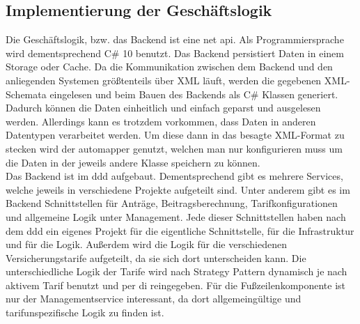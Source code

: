 \subsection{Implementierung der Geschäftslogik}
\label{geschaeftslogikimplementieren}
Die Geschäftslogik, bzw. das Backend ist eine \gls{net} \gls{api}. Als Programmiersprache wird dementsprechend C\# 10 benutzt. Das Backend persistiert Daten in einem Storage oder Cache.  Da die Kommunikation zwischen dem Backend und den anliegenden Systemen größtenteils über XML läuft, werden die gegebenen XML-Schemata eingelesen und beim Bauen des Backends als C\# Klassen generiert. Dadurch können die Daten einheitlich und einfach geparst und ausgelesen werden. Allerdings kann es trotzdem vorkommen, dass Daten in anderen Datentypen verarbeitet werden. Um diese dann in das besagte XML-Format zu stecken  wird der \gls{automapper} genutzt, welchen man nur konfigurieren muss um die Daten in der jeweils andere Klasse speichern zu können.\\

Das Backend ist im \gls{ddd} aufgebaut. Dementsprechend gibt es mehrere Services, welche jeweils in verschiedene Projekte aufgeteilt sind. Unter anderem gibt es im Backend Schnittstellen für Anträge, Beitragsberechnung, Tarifkonfigurationen und allgemeine Logik unter Management. Jede dieser Schnittstellen haben nach dem \gls{ddd} ein eigenes Projekt für die eigentliche Schnittstelle, für die Infrastruktur und für die Logik. Außerdem wird die Logik für die verschiedenen Versicherungstarife aufgeteilt, da sie sich dort unterscheiden kann. Die unterschiedliche Logik der Tarife wird nach Strategy Pattern  dynamisch je nach aktivem Tarif benutzt und per \gls{di} reingegeben. Für die Fußzeilenkomponente ist nur der Managementservice interessant, da dort allgemeingültige und tarifunspezifische Logik zu finden ist.\\

